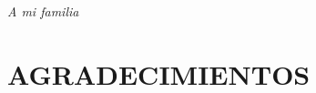 \documentclass[12pt]{article}
\providecommand\phantomsection{} %
\begin{document}
%
%

\newpage
\phantomsection
{}
\vspace*{7cm}
\begin{flushright}
\textit{\Large A mi familia}\\
\end{flushright}

\newpage
\phantomsection
\section*{\centering AGRADECIMIENTOS}
\end{document}
